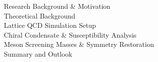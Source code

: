 \documentclass[10pt, aspectratio=169]{beamer} %
\begin{document}
\begin{frame}
\mysubtitle{}
\vspace*{\fill}
\vspace{1.2cm}

\vspace*{\fill}
\end{frame}

\begin{frame}
\vfill
\begin{center}
    \begin{minipage}{0.78\textwidth}

        \mybullet Research Background \& Motivation \\[0.9em]
        \mybullet Theoretical Background \\[0.9em]
        \mybullet Lattice QCD Simulation Setup \\[0.9em]
        \mybullet Chiral Condensate \& Susceptibility Analysis \\[0.9em]
        \mybullet Meson Screening Masses \& Symmetry Restoration \\[0.9em]
        \mybullet Summary and Outlook

    \end{minipage}
\end{center}
\vfill
\end{frame}
\end{document}
